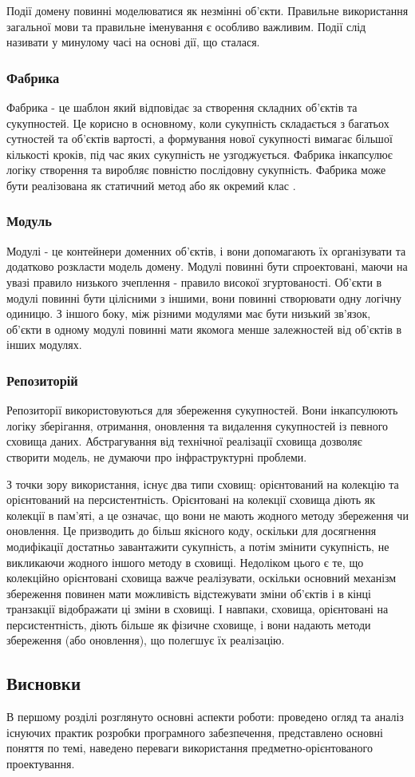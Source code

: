 Події домену повинні моделюватися як незмінні об'єкти.
Правильне використання загальної мови та правильне іменування
є особливо важливим. Події слід називати у минулому часі на основі дії, що сталася.

\subsubsection{Фабрика}
Фабрика - це шаблон який відповідає за створення складних об'єктів та сукупностей.
Це корисно в основному, коли сукупність складається з багатьох 
сутностей та об'єктів вартості, а формування нової сукупності
вимагає більшої кількості кроків, під час яких сукупність не узгоджується.
Фабрика інкапсулює логіку створення та виробляє повністю послідовну сукупність.
Фабрика може бути реалізована як статичний метод або як окремий клас \cite{patterns-gamma}.

\subsubsection{Модуль}
Модулі - це контейнери доменних об'єктів, і вони допомагають їх
організувати та додатково розкласти модель домену.
Модулі повинні бути спроектовані, маючи на увазі правило низького
зчеплення - правило високої згуртованості. Об'єкти в модулі 
повинні бути цілісними з іншими, вони повинні створювати одну логічну одиницю.
З іншого боку, між різними модулями має бути низький зв'язок,
об'єкти в одному модулі повинні мати якомога менше залежностей
від об'єктів в інших модулях.

\subsubsection{Репозиторій}
Репозиторії використовуються для збереження сукупностей.
Вони інкапсулюють логіку зберігання, отримання, оновлення та
видалення сукупностей із певного сховища даних.
Абстрагування від технічної реалізації сховища дозволяє створити модель,
не думаючи про інфраструктурні проблеми.

З точки зору використання, існує два типи сховищ: орієнтований на колекцію
та орієнтований на персистентність. Орієнтовані на колекції
сховища діють як колекції в пам'яті, а це означає,
що вони не мають жодного методу збереження чи оновлення.
Це призводить до більш якісного коду, оскільки для досягнення
модифікації достатньо завантажити сукупність, а потім змінити сукупність,
не викликаючи жодного іншого методу в сховищі. Недоліком цього є те,
що колекційно орієнтовані сховища важче реалізувати, оскільки основний механізм
збереження повинен мати можливість відстежувати зміни об'єктів
і в кінці транзакції відображати ці зміни в сховищі. І навпаки,
сховища, орієнтовані на персистентність, діють більше як фізичне сховище,
і вони надають методи збереження (або оновлення), що полегшує їх реалізацію.

\subsection{Висновки}
В першому розділі розглянуто основні аспекти роботи: проведено огляд
та аналіз існуючих практик розробки програмного забезпечення,
представлено основні поняття по темі, наведено переваги використання
предметно-орієнтованого проектування.

